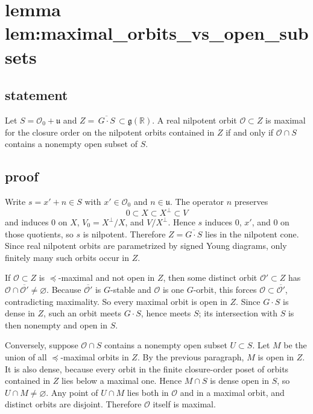 \documentclass[
]{article}
\author{}
\date{}
\begin{document}
\section{lemma
lem:maximal\_orbits\_vs\_open\_subsets}\label{lemma-lemmaximal_orbits_vs_open_subsets}

\subsection{statement}\label{statement}

Let \(S=\mathcal O_0+\mathfrak u\) and
\(Z=\overline{\,G\cdot S\,}\subset \mathfrak g(\mathbb R)\). A real
nilpotent orbit \(\mathcal O\subset Z\) is maximal for the closure order
on the nilpotent orbits contained in \(Z\) if and only if
\(\mathcal O\cap S\) contains a nonempty open subset of \(S\).

\subsection{proof}\label{proof}

Write \(s=x'+n\in S\) with \(x'\in\mathcal O_0\) and
\(n\in\mathfrak u\). The operator \(n\) preserves \[
0\subset X\subset X^\perp\subset V
\] and induces \(0\) on \(X\), \(V_0=X^\perp/X\), and \(V/X^\perp\).
Hence \(s\) induces \(0\), \(x'\), and \(0\) on those quotients, so
\(s\) is nilpotent. Therefore \(Z=\overline{G\cdot S}\) lies in the
nilpotent cone. Since real nilpotent orbits are parametrized by signed
Young diagrams, only finitely many such orbits occur in \(Z\).

If \(\mathcal O\subset Z\) is \(\preceq\)-maximal and not open in \(Z\),
then some distinct orbit \(\mathcal O'\subset Z\) has
\(\mathcal O\cap\overline{\mathcal O'}\neq\varnothing\). Because
\(\overline{\mathcal O'}\) is \(G\)-stable and \(\mathcal O\) is one
\(G\)-orbit, this forces \(\mathcal O\subset\overline{\mathcal O'}\),
contradicting maximality. So every maximal orbit is open in \(Z\). Since
\(G\cdot S\) is dense in \(Z\), such an orbit meets \(G\cdot S\), hence
meets \(S\); its intersection with \(S\) is then nonempty and open in
\(S\).

Conversely, suppose \(\mathcal O\cap S\) contains a nonempty open subset
\(U\subset S\). Let \(M\) be the union of all \(\preceq\)-maximal orbits
in \(Z\). By the previous paragraph, \(M\) is open in \(Z\). It is also
dense, because every orbit in the finite closure-order poset of orbits
contained in \(Z\) lies below a maximal one. Hence \(M\cap S\) is dense
open in \(S\), so \(U\cap M\neq\varnothing\). Any point of \(U\cap M\)
lies both in \(\mathcal O\) and in a maximal orbit, and distinct orbits
are disjoint. Therefore \(\mathcal O\) itself is maximal.
\end{document}
